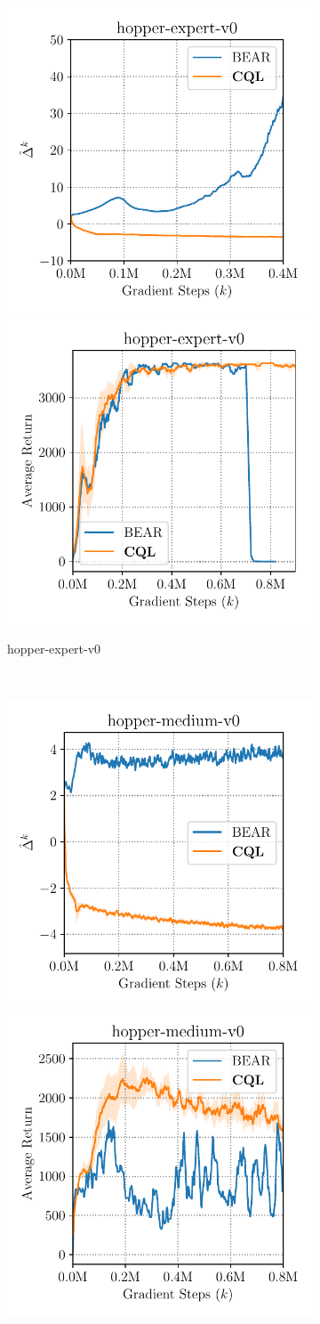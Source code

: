 \begin{figure}
    \begin{subfigure}[h]{0.49\linewidth}
      \centering
      \includegraphics[width=0.47\linewidth]{chapters/cql/images/hopper-expert-v0bear_vs_cql.pdf}
      \includegraphics[width=0.47\linewidth]{chapters/cql/images/hopper-expert-v0bear_vs_cql_return.pdf}
      \caption{hopper-expert-v0}
    \end{subfigure}
    ~
    \begin{subfigure}[h]{0.49\linewidth}
      \centering
      \includegraphics[width=0.47\linewidth]{chapters/cql/images/hopper-medium-v0bear_vs_cql_again.pdf}
      \includegraphics[width=0.47\linewidth]{chapters/cql/images/hopper-medium-v0bear_vs_cql_again_return.pdf}

\end{subfigure}
\end{figure}
